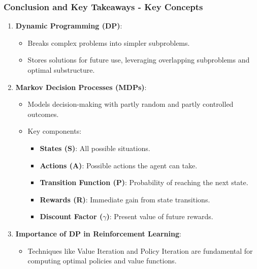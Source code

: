\documentclass[aspectratio=169]{beamer}
\begin{document}
\begin{frame}[fragile]
    \frametitle{Conclusion and Key Takeaways - Key Concepts}
    \begin{enumerate}
        \item \textbf{Dynamic Programming (DP)}:
        \begin{itemize}
            \item Breaks complex problems into simpler subproblems.
            \item Stores solutions for future use, leveraging overlapping subproblems and optimal substructure.
        \end{itemize}
        
        \item \textbf{Markov Decision Processes (MDPs)}:
        \begin{itemize}
            \item Models decision-making with partly random and partly controlled outcomes.
            \item Key components:
            \begin{itemize}
                \item \textbf{States (S)}: All possible situations.
                \item \textbf{Actions (A)}: Possible actions the agent can take.
                \item \textbf{Transition Function (P)}: Probability of reaching the next state.
                \item \textbf{Rewards (R)}: Immediate gain from state transitions.
                \item \textbf{Discount Factor ($\gamma$)}: Present value of future rewards.
            \end{itemize}
        \end{itemize}
        
        \item \textbf{Importance of DP in Reinforcement Learning}:
        \begin{itemize}
            \item Techniques like Value Iteration and Policy Iteration are fundamental for computing optimal policies and value functions.
        \end{itemize}
    \end{enumerate}
\end{frame}
\end{document}
